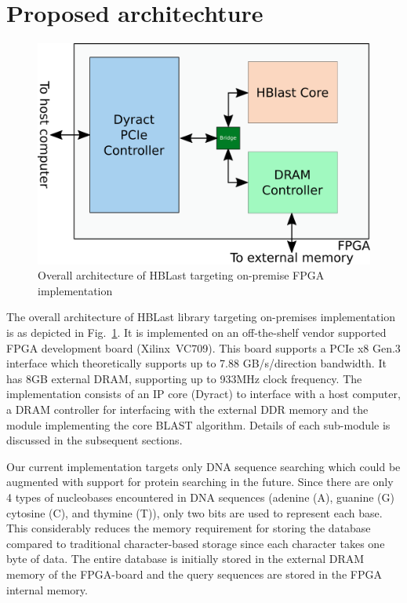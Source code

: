 \section{Proposed architechture}
\label{sec:propesedArch}

\begin{figure}[t!]
\centering
\includegraphics[width=0.9\columnwidth]{Figures/sysArch.pdf}
\caption{Overall architecture of HBLast targeting on-premise FPGA implementation} \label{fig:sysArch}
\end{figure}

The overall architecture of HBLast library targeting on-premises implementation is as depicted in Fig.~\ref{fig:sysArch}.
It is implemented on an off-the-shelf vendor supported FPGA development board (Xilinx~VC709).
This board supports a PCIe x8 Gen.3 interface which theoretically supports up to 7.88 GB/s/direction bandwidth.
It has 8GB external DRAM, supporting up to 933MHz clock frequency.
The implementation consists of an IP core (Dyract) to interface with a host computer, a DRAM controller for interfacing with the external DDR memory and the module implementing the core BLAST algorithm.
Details of each sub-module is discussed in the subsequent sections.

Our current implementation targets only DNA sequence searching which could be augmented with support for protein searching in the future.
Since there are only 4 types of nucleobases encountered in DNA sequences (adenine (A), guanine (G) cytosine (C), and thymine (T)), only two bits are used to represent each base.
This considerably reduces the memory requirement for storing the database compared to traditional character-based storage since each character takes one byte of data.
The entire database is initially stored in the external DRAM memory of the FPGA-board and the query sequences are stored in the FPGA internal memory.

